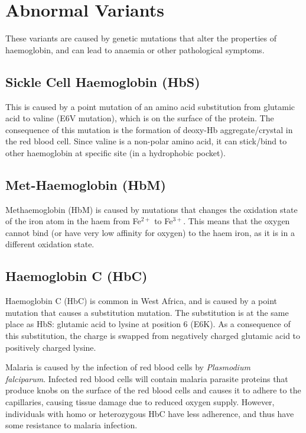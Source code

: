 \documentclass[a4paper, 12pt]{report}
\begin{document}
\section{Abnormal Variants}

These variants are caused by genetic mutations that alter the properties of haemoglobin, and can lead to anaemia or other pathological symptoms.

\subsection{Sickle Cell Haemoglobin (HbS)}

This is caused by a point mutation of an amino acid substitution from glutamic acid to valine (E6V mutation), which is on the surface of the protein.
The consequence of this mutation is the formation of deoxy-Hb aggregate/crystal in the red blood cell.
Since valine is a non-polar amino acid, it can stick/bind to other haemoglobin at specific site (in a hydrophobic pocket).

\subsection{Met-Haemoglobin (HbM)}

Methaemoglobin (HbM) is caused by mutations that changes the oxidation state of the iron atom in the haem from Fe$^{2+}$ to Fe$^{3+}$.
This means that the oxygen cannot bind (or have very low affinity for oxygen) to the haem iron, as it is in a different oxidation state.

\subsection{Haemoglobin C (HbC)}

Haemoglobin C (HbC) is common in West Africa, and is caused by a point mutation that causes a substitution mutation.
The substitution is at the same place as HbS: glutamic acid to lysine at position 6 (E6K).
As a consequence of this substitution, the charge is swapped from negatively charged glutamic acid to positively charged lysine.

Malaria is caused by the infection of red blood cells by \textit{Plasmodium \\falciparum}.
Infected red blood cells will contain malaria parasite proteins that produce knobs on the surface of the red blood cells and causes it to adhere to the capillaries, causing tissue damage due to reduced oxygen supply.
However, individuals with homo or heterozygous HbC have less adherence, and thus have some resistance to malaria infection.
\end{document}
